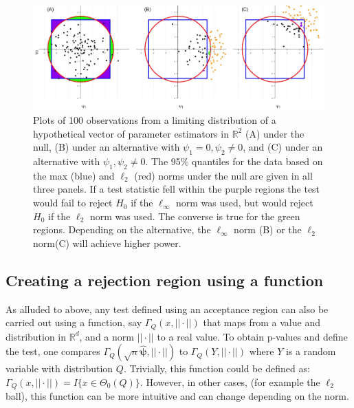 \documentclass{article}
\newcommand{\rvv}{Y}
\newcommand{\distv}{Q}
\begin{document}
\begin{figure}
	\centering
	\includegraphics[width = \linewidth]{figure_code/pwr_cmp.jpeg}
	\caption{Plots of 100 observations from a limiting distribution of a hypothetical vector of parameter estimators in $\mathbb{R}^2$ (A) under the null, (B) under an alternative with $\psi_1 = 0, \psi_2 \neq 0$, and (C) under an alternative with $\psi_1, \psi_2 \neq 0$. The 95\% quantiles for the data based on the max (blue) and $\ell_2$ (red) norms under the null are given in all three panels. If a test statistic fell within the purple regions the test would fail to reject $H_0$ if the $\ell_\infty$ norm was used, but would reject $H_0$ if the $\ell_2$ norm was used.  The converse is true for the green regions.  Depending on the alternative, the $\ell_\infty$ norm (B) or the $\ell_2$ norm(C) will achieve higher power.}
	\label{fig:figure1}
\end{figure}

\subsection{Creating a rejection region using a function}
As alluded to above, any test defined using an acceptance region can also be carried out using a function, say $\Gamma_\distv(x, ||\cdot||)$ that maps from a value and distribution in $\mathbb{R}^d$, and a norm $||\cdot||$ to a real value.  To obtain p-values and define the test, one compares $\Gamma_\distv(\sqrt{n}\hat{\boldsymbol{\psi}}, ||\cdot||)$ to $\Gamma_\distv(\rvv, ||\cdot||)$ where $\rvv$ is a random variable with distribution $\distv$. Trivially, this function could be defined as: $\Gamma_\distv(x, ||\cdot||) = I\{x \in \Theta_0(\distv)\}$.  However, in other cases, (for example the $\ell_2$ ball), this function can be more intuitive and can change depending on the norm.  
\end{document}
